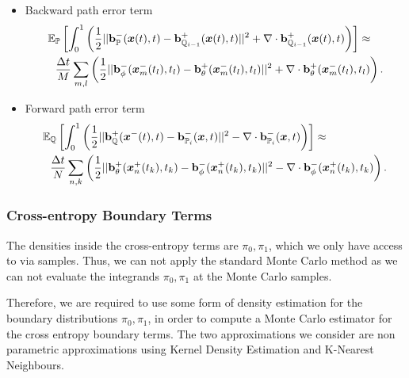 \documentclass[a4paper,12pt,twoside,openright]{report}
\theoremstyle{definition}
\begin{document}
\begin{itemize}
    \item Backward path error term 
\begin{align}
    \mathbb{E}&_{{\mathbb{P}}}\left[\int_0^1 \left(\frac{1}{2}||{\mathbf{b}}_{\mathbb{P}}^{-}({\bm{x}}(t),t) - {\mathbf{b}}_{{\mathbb{Q}}_{i-1}}^{+}({\bm{x}}(t),t)||^2 + \nabla\cdot{\mathbf{b}}^{+}_{{\mathbb{Q}}_{i-1}}({\bm{x}}(t),t) \right)\right] \approx \nonumber   \\
    &\frac{\Delta t}{M} \sum_{m,l}\left(\frac{1}{2}||{\mathbf{b}}_\phi^{-}({\bm{x}}^{-}_m(t_l), t_l) - {\mathbf{b}}_{\theta}^{+}({\bm{x}}^{-}_m(t_l), t_l)||^2 + \nabla\cdot{\mathbf{b}}^{+}_{\theta}({\bm{x}}^{-}_m(t_l), t_l)\right).
\end{align}
    \item Forward path error term
\begin{align}
    \mathbb{E}&_{{\mathbb{Q}}}\left[\int_0^1 \left(\frac{1}{2}||{\mathbf{b}}_{\mathbb{Q}}^{+}({\bm{x}}^{-}(t), t) - {\mathbf{b}}_{{\mathbb{P}}_{i}}^{-}({\bm{x}}, t)||^2 - \nabla\cdot{\mathbf{b}}^{-}_{{\mathbb{P}}_{i}}({\bm{x}}, t) \right)\right]  \approx \nonumber   \\
    &\frac{\Delta t}{N} \sum_{n,k}\left(\frac{1}{2}||{\mathbf{b}}_\theta^{+}({\bm{x}}^{+}_n(t_k), t_k) - {\mathbf{b}}_{\phi}^{-}({\bm{x}}^{+}_n(t_k), t_k)||^2 - \nabla\cdot{\mathbf{b}}^{-}_{\phi}({\bm{x}}^{+}_n(t_k), t_k)\right).
\end{align}
\end{itemize}
\subsubsection{Cross-entropy Boundary Terms}

The densities inside the cross-entropy terms are $\pi_0, \pi_1$, which we only have access to via samples. Thus, we can not apply the standard Monte Carlo  method as we can not evaluate the integrands $\pi_0, \pi_1$ at the Monte Carlo samples.

Therefore, we are required to use some form of density estimation for the boundary distributions $\pi_0, \pi_1$, in order to compute a Monte Carlo  estimator for the cross entropy boundary terms. The two approximations we consider are non parametric approximations using Kernel Density Estimation and K-Nearest Neighbours.
\end{document}
